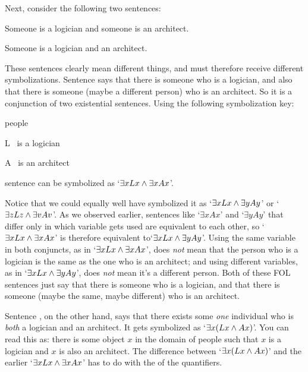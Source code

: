 
Next, consider the following two sentences:

	\begin{earg}
		\item[\ex{scope1}] Someone is a logician and someone is an architect.
		\item[\ex{scope2}] Someone is a logician and an architect.
	\end{earg}
These sentences clearly mean different things, and must therefore receive different symbolizations.  Sentence  says that there is someone who is a logician, and also that there is someone (maybe a different person) who is an architect. So it is a conjunction of two existential sentences. Using the following symbolization key:

	\begin{ekey}
		\item[\text{domain}] people
		\item[L] \blank\ is a logician
		\item[A]\blank\ is an architect
	\end{ekey}
sentence  can be symbolized as `$\exists xLx \wedge \exists xAx$'.

 Notice that we could equally well have symbolized it as `$\exists x Lx \wedge \exists yAy$' or `$\exists zLz \wedge \exists v Av$'.  As we observed earlier, sentences like `$\exists x Ax$' and `$\exists y Ay$' that differ only in which variable gets used are equivalent to each other, so  `$\exists xLx \wedge \exists xAx$' is therefore equivalent to`$\exists x Lx \wedge \exists yAy$'.  Using the same variable in both conjuncts, as in `$\exists xLx \wedge \exists xAx$', does \emph{not} mean that the person who is a logician is the same as the one who is an architect; and using different variables, as in `$\exists x Lx \wedge \exists yAy$',  does \emph{not} mean it's a different person.  Both of these FOL sentences just say that there is someone who is a logician, and that there is someone (maybe the same, maybe different) who is an architect.



Sentence , on the other hand, says that there exists some \emph{one} individual who is \emph{both} a logician and an architect.  It gets symbolized as `$\exists x(Lx \wedge Ax)$'.   You can read this as: there is some object $x$ in the domain of people such that $x$ is a logician and $x$ is also an architect.  The difference between `$\exists x(Lx \wedge Ax)$'  and the earlier `$\exists xLx \wedge \exists xAx$' has to do with the  of the quantifiers.

